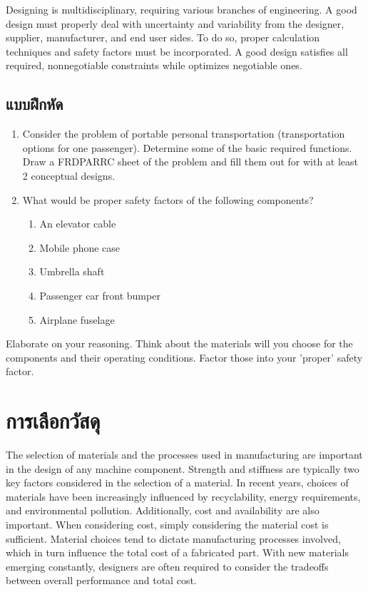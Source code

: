 \documentclass[a4paper,openany,12pt]{book}
\begin{document}
Designing is multidisciplinary, requiring various branches of
engineering. A good design must properly deal with uncertainty and
variability from the designer, supplier, manufacturer, and end user
sides. To do so, proper calculation techniques and safety factors must
be incorporated. A good design satisfies all required, nonnegotiable
constraints while optimizes negotiable ones.

\section{แบบฝึกหัด}
\label{sec:orgaa909db}
\begin{enumerate}
\item Consider the problem of portable personal transportation (transportation options for one passenger). Determine some of the basic required functions. Draw a FRDPARRC sheet of the problem and fill them out for with at least 2 conceptual designs.
\item What would be proper safety factors of the following components?
\begin{enumerate}
\item An elevator cable
\item Mobile phone case
\item Umbrella shaft
\item Passenger car front bumper
\item Airplane fuselage
\end{enumerate}
\end{enumerate}

Elaborate on your reasoning. Think about the materials will you choose for the components and their operating conditions. Factor those into your 'proper' safety factor.

\chapter{การเลือกวัสดุ}
\label{sec:org95718b7}
The selection of materials and the processes used in manufacturing are
important in the design of any machine component. Strength and stiffness
are typically two key factors considered in the selection of a material.
In recent years, choices of materials have been increasingly influenced
by recyclability, energy requirements, and environmental pollution.
Additionally, cost and availability are also important. When considering
cost, simply considering the material cost is sufficient. Material
choices tend to dictate manufacturing processes involved, which in turn
influence the total cost of a fabricated part. With new materials
emerging constantly, designers are often required to consider the
tradeoffs between overall performance and total cost.
\end{document}
